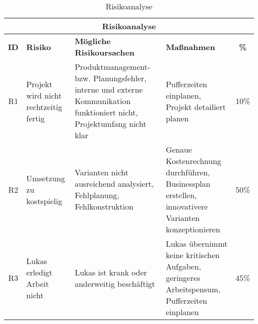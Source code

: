 \begin{table}[H]
  \centering
  \small
  \begin{tabular}{c|p{}|p{}|p{}|c}
    \multicolumn{5}{c}{\textbf{Risikoanalyse}}                                                                                                                                                                                                                                                     \\
    \toprule
    \textbf{ID} & \textbf{Risiko}                       & \textbf{Mögliche Risikoursachen}                                                                                       & \textbf{Maßnahmen}                                                                                & \textbf{\%} \\
    \midrule
    R1          & Projekt wird nicht rechtzeitig fertig & Produktmanagement- bzw. Planungsfehler, interne und externe Kommunikation funktioniert nicht, Projektumfang nicht klar & Pufferzeiten einplanen, Projekt detailiert planen                                                 & 10\%        \\ \ghline
    R2          & Umsetzung zu kostspielig              & Varianten nicht ausreichend analysiert, Fehlplanung, Fehlkonstruktion                                                  & Genaue Kostenrechnung durchführen, Businessplan erstellen, innovativere Varianten konzeptionieren & 50\%        \\ \ghline
    R3          & Lukas erledigt Arbeit nicht           & Lukas ist krank oder anderweitig beschäftigt                                                                           & Lukas übernimmt keine kritischen Aufgaben, geringeres Arbeitspensum, Pufferzeiten einplanen       & 45\%        \\
    \bottomrule
  \end{tabular}
  \caption{Risikoanalyse}
  \label{tab:risikoanalyse}
\end{table}
